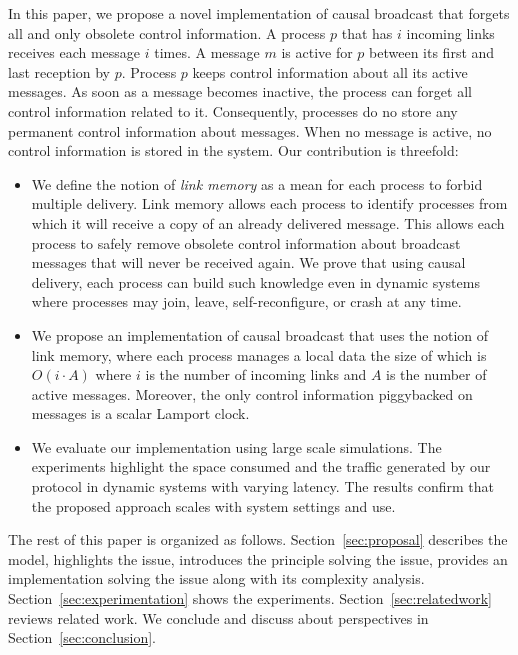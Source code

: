 In this paper, we propose a novel implementation of causal broadcast that
forgets all and only obsolete control information. A process $p$ that has $i$
incoming links receives each message $i$ times. A message $m$ is active for $p$
between its first and last reception by $p$. Process $p$ keeps control
information about all its active messages. As soon as a message becomes
inactive, the process can forget all control information related to it.
Consequently, processes do no store any permanent control information about
messages. When no message is active, no control information is stored in the
system. 
\noindent Our contribution is threefold:
\begin{itemize}[leftmargin=*]
\item We define the notion of \emph{link memory} as a mean for each process to
  forbid multiple delivery.  Link memory allows each process to identify
  processes from which it will receive a copy of an already delivered
  message. This allows each process to safely remove obsolete control
  information about broadcast messages that will never be received again. We
  prove that using causal delivery, each process can build such knowledge even
  in dynamic systems where processes may join, leave, self-reconfigure, or crash
  at any time.
\item We propose an implementation of causal broadcast that uses the notion of
  link memory, where each process manages a local data the size of which is
  $O(i \cdot A)$ where $i$ is the number of incoming links and $A$ is the number
  of active messages. Moreover, the only control information piggybacked on
  messages is a scalar Lamport clock.
\item We evaluate our implementation using large scale simulations. The
  experiments highlight the space consumed and the traffic generated by our
  protocol in dynamic systems with varying latency. The results confirm that the
  proposed approach scales with system settings and use.
\end{itemize}

The rest of this paper is organized as follows.  Section~\ref{sec:proposal}
describes the model, highlights the issue, introduces the principle solving the
issue, provides an implementation solving the issue along with its complexity
analysis. Section~\ref{sec:experimentation} shows the
experiments. Section~\ref{sec:relatedwork} reviews related work. We conclude and
discuss about perspectives in Section~\ref{sec:conclusion}.


